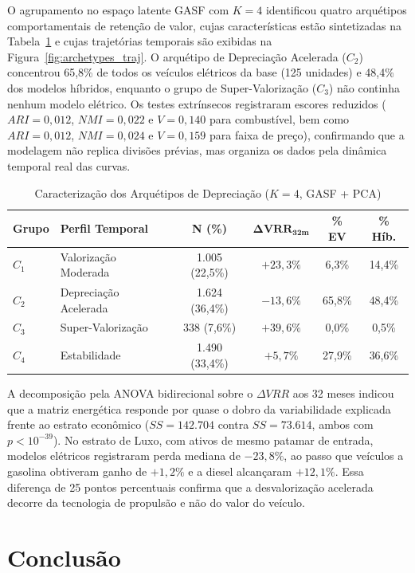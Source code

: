 \documentclass[conference]{IEEEtran}
\begin{document}
O agrupamento no espaço latente GASF com $K=4$ identificou quatro arquétipos comportamentais de retenção de valor, cujas características estão sintetizadas na Tabela~\ref{tab:arquetipos} e cujas trajetórias temporais são exibidas na Figura~\ref{fig:archetypes_traj}. O arquétipo de Depreciação Acelerada ($C_2$) concentrou 65,8\% de todos os veículos elétricos da base (125 unidades) e 48,4\% dos modelos híbridos, enquanto o grupo de Super-Valorização ($C_3$) não continha nenhum modelo elétrico. Os testes extrínsecos registraram escores reduzidos ($ARI = 0,012$, $NMI = 0,022$ e $V = 0,140$ para combustível, bem como $ARI = 0,012$, $NMI = 0,024$ e $V = 0,159$ para faixa de preço), confirmando que a modelagem não replica divisões prévias, mas organiza os dados pela dinâmica temporal real das curvas.

\begin{table}[htbp]
\caption{Caracterização dos Arquétipos de Depreciação ($K=4$, GASF + PCA)}
\label{tab:arquetipos}
\centering
\scriptsize
\setlength{\tabcolsep}{3pt}
\begin{tabular}{llcccc}
\toprule
\textbf{Grupo} & \textbf{Perfil Temporal} & \textbf{N (\%)} & $\mathbf{\Delta VRR_{32m}}$ & \textbf{\% EV} & \textbf{\% Híb.} \\
\midrule
$C_1$ & Valorização Moderada & 1.005 (22,5\%) & $+23,3\%$ & 6,3\% & 14,4\% \\
$C_2$ & Depreciação Acelerada & 1.624 (36,4\%) & $-13,6\%$ & 65,8\% & 48,4\% \\
$C_3$ & Super-Valorização & 338 (7,6\%) & $+39,6\%$ & 0,0\% & 0,5\% \\
$C_4$ & Estabilidade & 1.490 (33,4\%) & $+5,7\%$ & 27,9\% & 36,6\% \\
\bottomrule
\end{tabular}
\end{table}

A decomposição pela ANOVA bidirecional sobre o $\Delta VRR$ aos 32 meses indicou que a matriz energética responde por quase o dobro da variabilidade explicada frente ao estrato econômico ($SS = 142.704$ contra $SS = 73.614$, ambos com $p < 10^{-39}$). No estrato de Luxo, com ativos de mesmo patamar de entrada, modelos elétricos registraram perda mediana de $-23,8\%$, ao passo que veículos a gasolina obtiveram ganho de $+1,2\%$ e a diesel alcançaram $+12,1\%$. Essa diferença de 25 pontos percentuais confirma que a desvalorização acelerada decorre da tecnologia de propulsão e não do valor do veículo.

\section{Conclusão}
\end{document}
